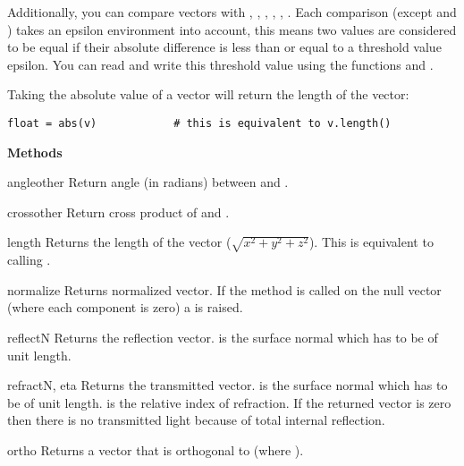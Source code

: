 Additionally, you can compare vectors with \code{==}, \code{!=}, \code{<}, 
\code{<=}, \code{>}, \code{>=}. Each
comparison (except \code{<} and \code{>}) takes an epsilon environment
into account, this means two values are considered to be equal if
their absolute difference is less than or equal to a threshold value
epsilon. You can read and write this threshold value using the
functions  and .

Taking the absolute value of a vector will return the length of the vector: 

\begin{verbatim}
float = abs(v)            # this is equivalent to v.length()
\end{verbatim}

{\bf Methods}

\begin{methoddesc}{angle}{other}
Return angle (in radians) between  and .
\end{methoddesc}

\begin{methoddesc}{cross}{other}
Return cross product of  and .
\end{methoddesc}

\begin{methoddesc}{length}{}
Returns the length of the vector ($\sqrt{x^2+y^2+z^2}$). This is
equivalent to calling .
\end{methoddesc}

\begin{methoddesc}{normalize}{}
Returns normalized vector. If the method is called on the null vector
(where each component is zero) a  is raised.
\end{methoddesc}

\begin{methoddesc}{reflect}{N}
Returns the reflection vector.  is the surface normal which has to be
of unit length.
\end{methoddesc}

\begin{methoddesc}{refract}{N, eta}
Returns the transmitted vector.  is the surface normal which has to
be of unit length.  is the relative index of refraction. If the
returned vector is zero then there is no transmitted light because of
total internal reflection.
\end{methoddesc}

\begin{methoddesc}{ortho}{}
Returns a vector that is orthogonal to  (where
).
\end{methoddesc}

